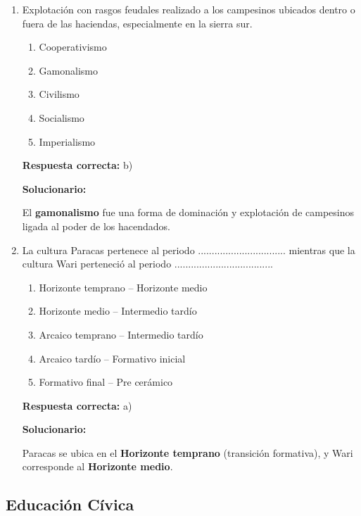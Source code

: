 \begin{enumerate}[resume]

\item  Explotación con rasgos feudales realizado a los campesinos ubicados dentro o fuera de las haciendas, especialmente en la sierra sur.
\begin{enumerate}[label=\alph*)]
	\item Cooperativismo
	\item Gamonalismo
	\item Civilismo
	\item Socialismo
	\item Imperialismo
\end{enumerate}

\textbf{Respuesta correcta:} b)

\vspace{2mm}
\textbf{Solucionario:}

El \textbf{gamonalismo} fue una forma de dominación y explotación de campesinos ligada al poder de los hacendados.

\item  La cultura Paracas pertenece al periodo ................................ mientras que la cultura Wari perteneció al periodo ....................................
\begin{enumerate}[label=\alph*)]
	\item Horizonte temprano -- Horizonte medio
	\item Horizonte medio -- Intermedio tardío
	\item Arcaico temprano -- Intermedio tardío
	\item Arcaico tardío -- Formativo inicial
	\item Formativo final -- Pre cerámico
\end{enumerate}

\textbf{Respuesta correcta:} a)

\vspace{2mm}
\textbf{Solucionario:}

Paracas se ubica en el \textbf{Horizonte temprano} (transición formativa), y Wari corresponde al \textbf{Horizonte medio}.

\end{enumerate}


\subsection*{Educación Cívica}

